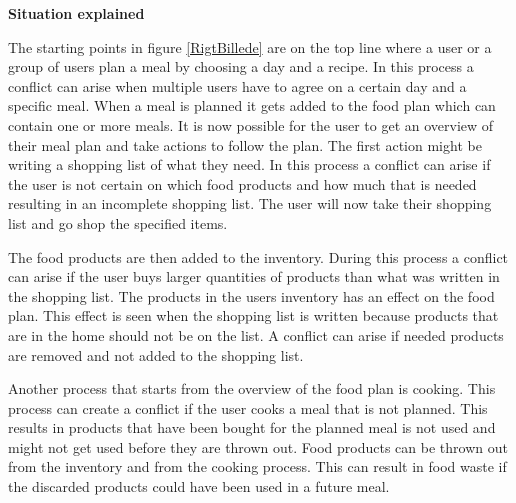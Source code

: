 \textbf{Situation explained}

The starting points in figure \ref{RigtBillede} are on the top line where a user or a group of users plan a meal by choosing a day and a recipe. In this process a conflict can arise when multiple users have to agree on a certain day and a specific meal. When a meal is planned it gets added to the food plan which can contain one or more meals. It is now possible for the user to get an overview of their meal plan and take actions to follow the plan. The first action might be writing a shopping list of what they need. In this process a conflict can arise if the user is not certain on which food products and how much that is needed resulting in an incomplete shopping list. The user will now take their shopping list and go shop the specified items. 

The food products are then added to the inventory. During this process a conflict can arise if the user buys larger quantities of products than what was written in the shopping list. The products in the users inventory has an effect on the food plan. This effect is seen when the shopping list is written because products that are in the home should not be on the list. A conflict can arise if needed products are removed and not added to the shopping list. 

Another process that starts from the overview of the food plan is cooking. This process can create a conflict if the user cooks a meal that is not planned. This results in products that have been bought for the planned meal is not used and might not get used before they are thrown out. Food products can be thrown out from the inventory and from the cooking process. This can result in food waste if the discarded products could have been used in a future meal.      
   


      